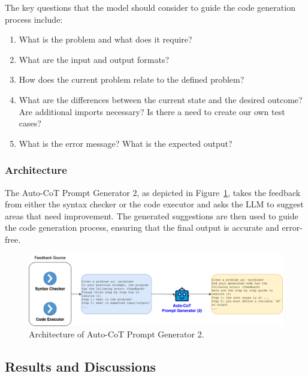 \documentclass[a4paper,oneside]{book}
\begin{document}
The key questions that the model should consider to guide the code generation process include:
\begin{enumerate}
  \item What is the problem and what does it require?

  \item What are the input and output formats?

  \item How does the current problem relate to the defined problem?

  \item What are the differences between the current state and the desired outcome? Are additional imports necessary? Is there a need to create our own test cases?

  \item What is the error message? What is the expected output?
\end{enumerate}

\subsubsection{Architecture}
The Auto-CoT Prompt Generator 2, as depicted in Figure~\ref{fig:cot_generator_2}, takes the feedback from either the syntax checker or the code executor and asks the LLM to suggest areas that need improvement. The generated suggestions are then used to guide the code generation process, ensuring that the final output is accurate and error-free.

\begin{figure}[H]
  \centering
  \includegraphics[width=1.0\textwidth]{img/cot_generator_2}
  \caption{Architecture of Auto-CoT Prompt Generator 2.}\label{fig:cot_generator_2}
\end{figure}

\subsection{Results and Discussions}
\end{document}
